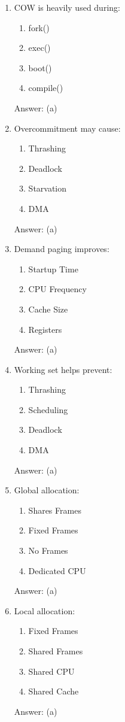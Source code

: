 \begin{enumerate}
\item COW is heavily used during:
\begin{enumerate}[label=(\alph*)]
\item fork()
\item exec()
\item boot()
\item compile()
\end{enumerate}
Answer: (a)

\item Overcommitment may cause:
\begin{enumerate}[label=(\alph*)]
\item Thrashing
\item Deadlock
\item Starvation
\item DMA
\end{enumerate}
Answer: (a)

\item Demand paging improves:
\begin{enumerate}[label=(\alph*)]
\item Startup Time
\item CPU Frequency
\item Cache Size
\item Registers
\end{enumerate}
Answer: (a)

\item Working set helps prevent:
\begin{enumerate}[label=(\alph*)]
\item Thrashing
\item Scheduling
\item Deadlock
\item DMA
\end{enumerate}
Answer: (a)

\item Global allocation:
\begin{enumerate}[label=(\alph*)]
\item Shares Frames
\item Fixed Frames
\item No Frames
\item Dedicated CPU
\end{enumerate}
Answer: (a)

\item Local allocation:
\begin{enumerate}[label=(\alph*)]
\item Fixed Frames
\item Shared Frames
\item Shared CPU
\item Shared Cache
\end{enumerate}
Answer: (a)


\end{enumerate}
